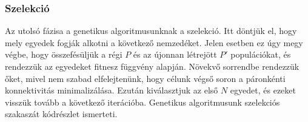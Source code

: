 \subsubsection{Szelekció}
Az utolsó fázisa a genetikus algoritmusunknak a szelekció.
Itt döntjük el, hogy mely egyedek fogják alkotni a következő nemzedéket.
Jelen esetben ez úgy megy végbe, hogy összefésüljük a régi $P$ és az újonnan létrejött $P'$ populációkat,
és rendezzük az egyedeket  fitnesz függvény alapján.
Növekvő sorrendbe rendezzük őket, mivel nem szabad elfelejtenünk, hogy célunk végső soron a páronkénti konnektivitás minimalizálása.
Ezután kiválasztjuk az első $N$ egyedet, és ezeket visszük tovább a következő iterációba.
Genetikus algoritmusunk szelekciós szakaszát  kódrészlet ismerteti.

